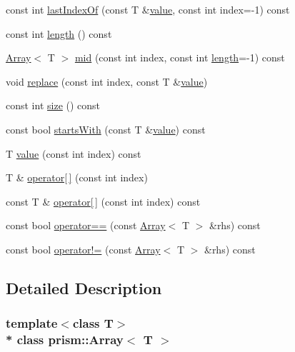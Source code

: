 \begin{DoxyCompactItemize}
const int \hyperlink{classprism_1_1_array_ae9d7ba407484ba1d2beea39c300a48de}{last\+Index\+Of} (const T \&\hyperlink{classprism_1_1_array_a2c5690996975510eed7112066b936d8f}{value}, const int index=-\/1) const 
\item 
const int \hyperlink{classprism_1_1_array_a7075e469a15ddfa81059842598fa9e89}{length} () const 
\item 
\hyperlink{classprism_1_1_array}{Array}$<$ T $>$ \hyperlink{classprism_1_1_array_a184d0853ea009fb9d156c1302d46a87d}{mid} (const int index, const int \hyperlink{classprism_1_1_array_a7075e469a15ddfa81059842598fa9e89}{length}=-\/1) const 
\item 
void \hyperlink{classprism_1_1_array_aa0aff831c9d2c94fd834d8abbbe94d2b}{replace} (const int index, const T \&\hyperlink{classprism_1_1_array_a2c5690996975510eed7112066b936d8f}{value})
\item 
const int \hyperlink{classprism_1_1_array_a83c88f0f351ac35798f40ed4e922e187}{size} () const 
\item 
const bool \hyperlink{classprism_1_1_array_aa80d5944d464d8de5f7b991b355e10b2}{starts\+With} (const T \&\hyperlink{classprism_1_1_array_a2c5690996975510eed7112066b936d8f}{value}) const 
\item 
T \hyperlink{classprism_1_1_array_a2c5690996975510eed7112066b936d8f}{value} (const int index) const 
\item 
T \& \hyperlink{classprism_1_1_array_aa8807977580f48dfd2cd7b6dd85dfebf}{operator\mbox{[}$\,$\mbox{]}} (const int index)
\item 
const T \& \hyperlink{classprism_1_1_array_a7a1278dfc1ae6ba4860787e3fd40c429}{operator\mbox{[}$\,$\mbox{]}} (const int index) const 
\item 
const bool \hyperlink{classprism_1_1_array_a17fded803080c4eed55773ad07ed8740}{operator==} (const \hyperlink{classprism_1_1_array}{Array}$<$ T $>$ \&rhs) const 
\item 
const bool \hyperlink{classprism_1_1_array_a8ec48eaa032005ff6141481ac18e6e9f}{operator!=} (const \hyperlink{classprism_1_1_array}{Array}$<$ T $>$ \&rhs) const 
\end{DoxyCompactItemize}


\subsection{Detailed Description}
\subsubsection*{template$<$class T$>$\\*
class prism\+::\+Array$<$ T $>$}

